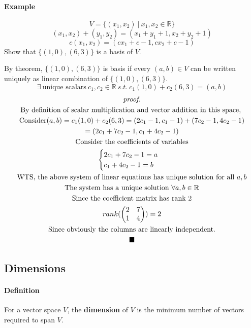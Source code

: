 \documentclass[11pt]{article}
\begin{document}
	\paragraph{Example}
	\[
		V = \{(x_1,x_2)\ \vert\ x_1, x_2 \in \mathbb{R}\}
	\]
	\[
		(x_1,x_2) + (y_1,y_2) = (x_1+y_1+1, x_2+y_2+1)
	\]
	\[
		c(x_1,x_2) = (cx_1+c-1, cx_2+c-1)
	\]
	Show that $\{(1,0),(6,3)\}$ is a basis of $V$.
	
	By theorem, $\{(1,0),(6,3)\}$ is basis if every $(a,b) \in V$ can be written uniquely as linear combination of $\{(1,0),(6,3)\}$.
	\[
		\exists\ \text{unique scalars}\ c_1, c_2 \in \mathbb{R}\ s.t.\ c_1(1,0) + c_2(6,3) = (a, b)
	\]
	\begin{multline*}
		\emph{proof.}\\
		\text{By definition of scalar multiplication and vector addition in this space, }\\
		\text{Consider} (a, b) = c_1(1,0) + c_2(6,3) = (2c_1 - 1, c_1 - 1) + (7c_2 -1, 4c_2 - 1)\\
		= (2c_1 + 7c_2 - 1, c_1 + 4c_2 - 1)\\
		\text{Consider the coefficients of variables}\\
		\begin{cases}
			2c_1 + 7c_2 - 1 = a \\
			c_1 + 4c_2 - 1 = b \\
		\end{cases}\\
		\text{WTS, the above system of linear equations has unique solution for all $a, b$} \\
		\text{The system has a unique solution $\forall a,b \in \mathbb{R}$} \\
		\text{Since the coefficient matrix has rank 2}\\
		rank(\begin{pmatrix}
			2 & 7 \\
			1 & 4 \\
		\end{pmatrix}) = 2 \\
		\text{Since obviously the columns are linearly independent.} \\
		\blacksquare
	\end{multline*}
	
	\subsection{Dimensions}
	\paragraph{Definition} For a vector space $V$, the \textbf{dimension} of $V$ is the minimum number of vectors required to span $V$.
	
\end{document}
